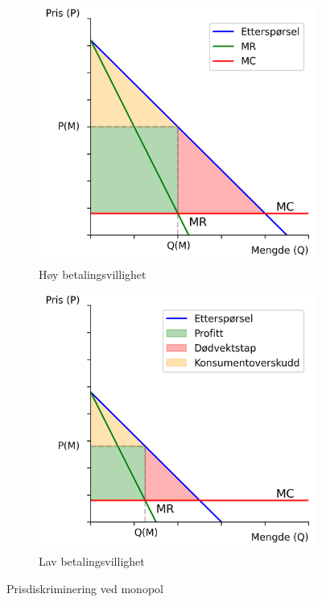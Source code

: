 \documentclass[
  12pt,
  a4paper,
  DIV=11,
  numbers=noendperiod]{scrartcl}
\begin{document}
\begin{figure}
\centering
\begin{subfigure}{.5\textwidth}
  \centering
  \includegraphics[width=.9\linewidth]{dokumentobjekter/figurer/hoy_betaling.png}
  \caption{Høy betalingsvillighet}
  \label{fig:hoy_betaling}
\end{subfigure}%
\begin{subfigure}{.5\textwidth}
  \centering
  \includegraphics[width=.9\linewidth]{dokumentobjekter/figurer/lav_betaling.png}
  \caption{Lav betalingsvillighet}
  \label{fig:lav_betaling}
\end{subfigure}
\caption{Prisdiskriminering ved monopol}
\label{fig:prisdiskrimineringsfigurer}
\end{figure}
\end{document}
